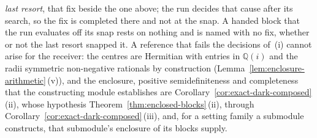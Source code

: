 \begin{requirement}
\emph{last resort}, that fix beside the one above; the run decides that cause
after its search, so the fix is completed there and not at the snap. A
handed block that the run evaluates off its snap rests on nothing and is
named with no fix, whether or not the last resort snapped it. A reference that fails
the decisions of \,(i) cannot arise for
the receiver: the centres are Hermitian with entries in $\mathbb{Q}(i)$ and
the radii symmetric non-negative rationals by construction
(Lemma~\ref{lem:enclosure-arithmetic}\,(v)), and the enclosure, positive
semidefiniteness and completeness that the constructing module establishes
are Corollary~\ref{cor:exact-dark-composed}\,(ii), whose hypothesis
Theorem~\ref{thm:enclosed-blocks}\,(ii), through
Corollary~\ref{cor:exact-dark-composed}\,(iii), and, for a setting family a
submodule constructs, that submodule's enclosure of its blocks supply.
\end{requirement}
